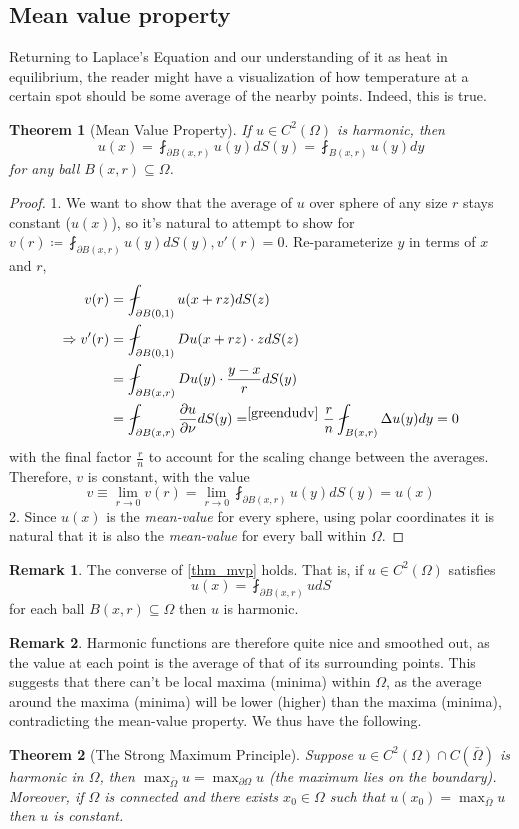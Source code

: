 \documentclass[openany, amssymb, psamsfonts]{amsart}
\newtheorem{thm}{Theorem}[section]
\theoremstyle{definition}
\newtheorem{rem}{Remark}[section]
\numberwithin{equation}{section}
\let\implies\Rightarrow
\begin{document}
\subsection{Mean value property}
Returning to Laplace's Equation and our understanding of it as heat in equilibrium, the reader might have a visualization of how temperature at a certain spot should be some average of the nearby points. Indeed, this is true.
\begin{thm} [Mean Value Property] \label{thm_mvp}
If $u \in C^2 (\Omega)$ is harmonic, then \[
u(x) = \fint_{\partial B(x, r)} u(y) dS(y) = \fint_{B(x, r)} u(y) dy
\]
for any ball $B(x, r) \subseteq \Omega$.
\end{thm}
\begin{proof}
    1. We want to show that the average of $u$ over sphere of any size $r$ stays constant ($u(x)$), so it's natural to attempt to show for $v(r) \coloneqq \fint_{\partial B(x, r)} u(y) dS(y), v'(r) = 0$. Re-parameterize $y$ in terms of $x$ and $r$, \begin{align*}
        v(r) &= \fint_{\partial B(0, 1)} u(x + rz) dS(z) \\
        \implies v'(r) &= \fint_{\partial B(0, 1)} Du(x + rz) \cdot z dS(z) \\
        &= \fint_{\partial B(x, r)} Du(y) \cdot \dfrac{y-x}{r} dS(y) \\
        &= \fint_{\partial B(x, r)} \dfrac{\partial u}{\partial \nu} dS(y) =^{\eqref{greendudv}} \dfrac{r}{n} \fint_{B(x, r)} \Delta u(y) dy = 0
    \end{align*}
    with the final factor $\frac{r}{n}$ to account for the scaling change between the averages. Therefore, $v$ is constant, with the value \[
    v \equiv \lim_{r \to 0} v(r) = \lim_{r \to 0} \fint_{\partial B(x, r)} u(y) dS(y) = u(x)
    \]
    2. Since $u(x)$ is the \textit{mean-value} for every sphere, using polar coordinates it is natural that it is also the \textit{mean-value} for every ball within $\Omega$.
\end{proof}
\begin{rem}
    The converse of \autoref{thm_mvp} holds. That is, if $u \in C^2(\Omega)$ satisfies \[
    u(x) = \fint_{\partial B(x, r)} u dS
    \]
    for each ball $B(x, r) \subseteq \Omega$ then $u$ is harmonic.
\end{rem}
\begin{rem}
Harmonic functions are therefore quite nice and smoothed out, as the value at each point is the average of that of its surrounding points. This suggests that there can't be local maxima (minima) within $\Omega$, as the average around the maxima (minima) will be lower (higher) than the maxima (minima), contradicting the mean-value property. We thus have the following.
\end{rem}
\begin{thm} [The Strong Maximum Principle]
    Suppose $u \in C^2(\Omega) \cap C(\bar{\Omega})$ is harmonic in $\Omega$, then $\max_{\bar{\Omega}} u = \max_{\partial \Omega} u$ (the maximum lies on the boundary). Moreover, if $\Omega$ is connected and there exists $x_0 \in \Omega$ such that $u(x_0) = \max_{\bar{\Omega}} u$ then $u$ is constant.
\end{thm}
\end{document}
